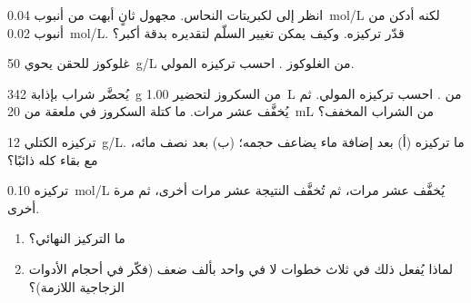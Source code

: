 \begin{exercise}[$\star\star$]\label{exo:g10:concentration-and-dilution:8}
انظر إلى  لكبريتات النحاس.  مجهول ثانٍ أبهت من أنبوب
\qty{0.04}{mol/L} لكنه أدكن من أنبوب
\qty{0.02}{mol/L}. قدّر تركيزه. وكيف يمكن تغيير السلّم لتقديره بدقة
أكبر؟
\end{exercise}

\begin{exercise}[$\star\star$]\label{exo:g10:concentration-and-dilution:9}
 غلوكوز للحقن يحوي \qty{50}{g/L} من الغلوكوز
. احسب تركيزه المولي.
\end{exercise}

\begin{exercise}[$\star\star$]\label{exo:g10:concentration-and-dilution:10}
يُحضَّر شراب بإذابة \qty{342}{g} من السكروز  لتحضير
\qty{1.00}{L} من . احسب تركيزه المولي. ثم يُخفَّف عشر مرات. ما كتلة
السكروز في ملعقة من \qty{20}{mL} من الشراب
المخفف؟
\end{exercise}

\begin{exercise}[$\star\star$]\label{exo:g10:concentration-and-dilution:11}
 تركيزه الكتلي \qty{12}{g/L}. ما تركيزه (أ) بعد إضافة ماء يضاعف حجمه؛
(ب) بعد  نصف مائه، مع بقاء  كله
ذائبًا؟
\end{exercise}

\begin{exercise}[$\star\star\star$]\label{exo:g10:concentration-and-dilution:12}
 تركيزه \qty{0.10}{mol/L} يُخفَّف عشر مرات، ثم تُخفَّف النتيجة عشر مرات
أخرى، ثم مرة أخرى.
\begin{enumerate}
  \item ما التركيز النهائي؟
  \item لماذا يُفعل ذلك في ثلاث خطوات لا في  واحد بألف
        ضعف (فكّر في أحجام الأدوات الزجاجية اللازمة)؟
\end{enumerate}
\end{exercise}

